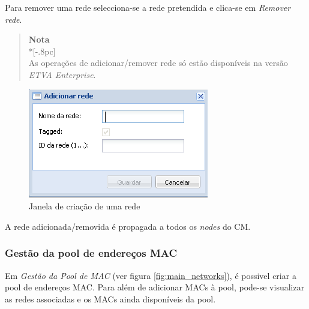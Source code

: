 Para remover uma rede selecciona-se a rede pretendida e clica-se em \emph{Remover rede}.

\begin{quote}
	{\large \bf Nota} \\*[-.8pc]
	\underline{\hspace{6in}} \\
	As operações de adicionar/remover rede só estão disponíveis na versão \emph{ETVA Enterprise}.
\end{quote}


\begin{figure}[H]
	\begin{center}
	\includegraphics[scale=0.5]{screenshots/network_create.png}
	\caption{Janela de criação de uma rede}
	\label{fig:network_create}
	\end{center}
\end{figure}

A rede adicionada/removida é propagada a todos os \emph{nodes} do CM.


\subsubsection{Gestão da pool de endereços MAC}
\label{sec:mac_pool}

Em \emph{Gestão da Pool de MAC} (ver figura \ref{fig:main_networks}), é possivel criar a pool de endereços MAC.
Para além de adicionar MACs à pool, pode-se visualizar as redes associadas e os MACs ainda disponíveis da pool.

